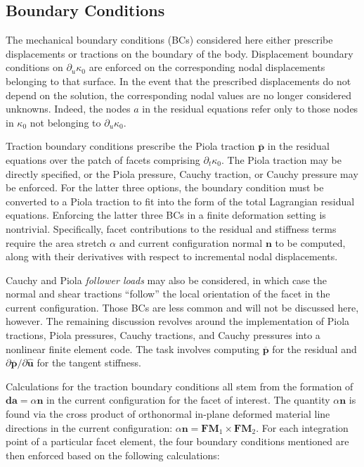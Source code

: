 \subsection{Boundary Conditions}
The mechanical boundary conditions (BCs) considered here either prescribe displacements or tractions on the boundary of the body. Displacement boundary conditions on $\partial_u\kappa_0$ are enforced on the corresponding nodal displacements belonging to that surface. In the event that the prescribed displacements do not depend on the solution, the corresponding nodal values are no longer considered unknowns. Indeed, the nodes $a$ in the residual equations refer only to those nodes in $\kappa_0$ not belonging to $\partial_u\kappa_0$.

Traction boundary conditions prescribe the Piola traction $\overline{\bm{p}}$ in the residual equations over the patch of facets comprising $\partial_t\kappa_0$. The Piola traction may be directly specified, or the Piola pressure, Cauchy traction, or Cauchy pressure may be enforced. For the latter three options, the boundary condition must be converted to a Piola traction to fit into the form of the total Lagrangian residual equations. Enforcing the latter three BCs in a finite deformation setting is nontrivial. Specifically, facet contributions to the residual and stiffness terms require the area stretch $\alpha$ and current configuration normal $\bm{n}$ to be computed, along with their derivatives with respect to incremental nodal displacements.

Cauchy and Piola \textit{follower loads} may also be considered, in which case the normal and shear tractions ``follow'' the local orientation of the facet in the current configuration. Those BCs are less common and will not be discussed here, however. The remaining discussion revolves around the implementation of Piola tractions, Piola pressures, Cauchy tractions, and Cauchy pressures into a nonlinear finite element code. The task involves computing $\overline{\bm{p}}$ for the residual and ${\partial \overline{\bm{p}}}/{\partial {\hat {\bm{u}}}}$ for the tangent stiffness.

Calculations for the traction boundary conditions all stem from the formation of ${\bm {da}} = \alpha{\bm n}$ in the current configuration for the facet of interest. The quantity $\alpha{\bm n}$ is found via the cross product of orthonormal in-plane deformed material line directions in the current configuration: ${\alpha}{\bm n} = {\bm F}{\bm M}_1 \times {\bm F}{\bm M}_2$. For each integration point of a particular facet element, the four boundary conditions mentioned are then enforced based on the following calculations:

